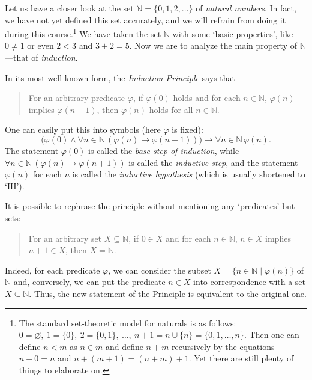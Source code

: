 \documentclass[12pt,notitlepage]{article}
\theoremstyle{plain}
\theoremstyle{definition}
\theoremstyle{plain}
\newcommand{\N}{\mathbb{N}}
\newcommand{\sbs}{\subseteq}
\newcommand{\void}{\varnothing}
\renewcommand{\phi}{\varphi}
\newcommand{\1}{\mathbf{1}}
\newcommand{\0}{\mathbf{0}}
\newcommand{\mcomm}[1]{}
\begin{document}
Let us have a closer look at the set $\N = \{0, 1, 2,\ldots \}$ of \emph{natural numbers}. In fact, we have not yet defined this set accurately, and we will refrain from doing it during this course.\footnote{The standard set-theoretic model for naturals is as follows: $0 = \void,\ 1 = \{0\},\ 2 = \{ 0, 1 \},\ \ldots,\ n + 1 = n \cup \{ n\} = \{0,1,\ldots, n \}$. Then one can define $n < m$ as $n \in m$ and define $n + m$ recursively by the equations $n + 0 = n$ and $n + (m + 1) = (n + m) + 1$. Yet there are still plenty of things to elaborate on.} We have taken the set $\N$ with some `basic properties', like $0 \neq 1$ or even $2 < 3$ and $3 + 2 = 5$. Now we are to analyze the main property of $\N$---that of \emph{induction}.

In its most well-known form, the \emph{Induction Principle} says that
\begin{quote}
For an arbitrary predicate $\phi$, if $\phi(0)$ holds and for each $n \in \N$, $\phi(n)$ implies $\phi(n+1)$, then $\phi(n)$ holds for all $n \in \N$.
\end{quote}
One can easily put this into symbols (here $\phi$ is fixed):
$$\bigl(\phi(0) \wedge \forall n\in \N \, (\phi(n) \to \phi(n+1))\bigr) \to \forall n \in \N\, \phi(n).$$
The statement $\phi(0)$ is called the \emph{base step of induction}, while $\forall n \in \N\, (\phi(n) \to \phi(n+1))$ is called the \emph{inductive step}, and the statement $\phi(n)$ for each $n$ is called the \emph{inductive hypothesis} (which is usually shortened to `IH').

\mcomm{If the Instructor has skipped the chapter on strings, I suggest he proves `intuitive validity' of the Induction Principle similarly to Example~\ref{strings:ind_intuition}.}

\noindent It is possible to rephrase the principle without mentioning any `predicates' but sets:
\begin{quote}
For an arbitrary set $X \sbs \N$, if $0 \in X$ and for each $n \in \N$, $n \in X$ implies $n+1 \in X$, then $X = \N$.
\end{quote}
Indeed, for each predicate $\phi$, we can consider the subset $X = \{ n \in \N \mid \phi(n) \}$ of $\N$ and, conversely, we can put the predicate $n \in X$ into correspondence with a set $X \sbs \N$. Thus, the new statement of the Principle is equivalent to the original one.

\mcomm{In practice, the students usually ask me to elaborate on this point. Sometimes, we abandon the `set version' of induction (except for the Least Number Principle, of course) altogether.}
\end{document}
